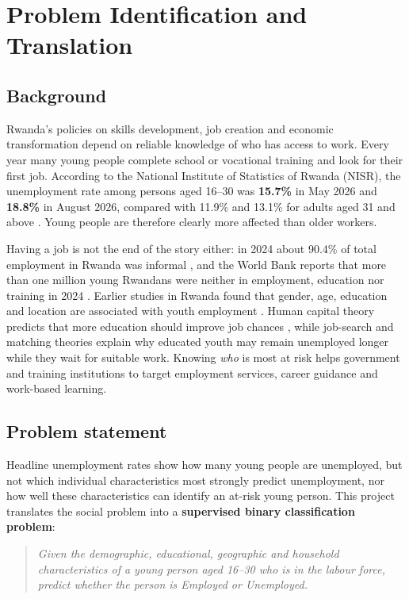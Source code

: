 \documentclass[11pt,a4paper]{article}
\begin{document}
\newpage
\tableofcontents
\newpage

\section{Problem Identification and Translation}

\subsection{Background}
Rwanda's policies on skills development, job creation and economic transformation depend on reliable
knowledge of who has access to work. Every year many young people complete school or vocational
training and look for their first job. According to the National Institute of Statistics of Rwanda
(NISR), the unemployment rate among persons aged 16--30 was \textbf{15.7\%} in May 2026 and
\textbf{18.8\%} in August 2026, compared with 11.9\% and 13.1\% for adults aged 31 and above
\cite{nisr_q2,nisr_q3}. Young people are therefore clearly more affected than older workers.

Having a job is not the end of the story either: in 2024 about 90.4\% of total employment in Rwanda
was informal \cite{nisr_annual}, and the World Bank reports that more than one million young
Rwandans were neither in employment, education nor training in 2024 \cite{worldbank}. Earlier
studies in Rwanda found that gender, age, education and location are associated with youth
employment \cite{ndagijimana,afdb}. Human capital theory predicts that more education should improve
job chances \cite{becker,mincer}, while job-search and matching theories explain why educated youth
may remain unemployed longer while they wait for suitable work. Knowing \emph{who} is most at risk
helps government and training institutions to target employment services, career guidance and
work-based learning.

\subsection{Problem statement}
Headline unemployment rates show how many young people are unemployed, but not which individual
characteristics most strongly predict unemployment, nor how well these characteristics can identify
an at-risk young person. This project translates the social problem into a \textbf{supervised binary
classification problem}:

\begin{quote}
\itshape Given the demographic, educational, geographic and household characteristics of a young
person aged 16--30 who is in the labour force, predict whether the person is Employed or Unemployed.
\end{quote}
\end{document}
